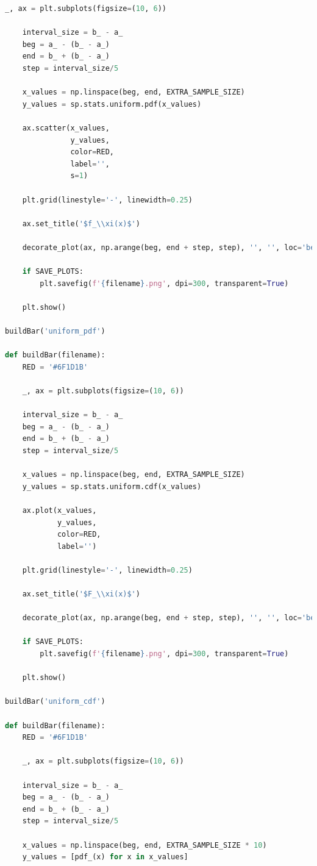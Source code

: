 \documentclass[a4paper, 14pt]{extarticle}
\begin{document}
\begin{center}
\begin{lstlisting}[language=Python]
    _, ax = plt.subplots(figsize=(10, 6))

    interval_size = b_ - a_
    beg = a_ - (b_ - a_)
    end = b_ + (b_ - a_)
    step = interval_size/5

    x_values = np.linspace(beg, end, EXTRA_SAMPLE_SIZE)
    y_values = sp.stats.uniform.pdf(x_values)

    ax.scatter(x_values, 
               y_values, 
               color=RED, 
               label='',
               s=1)

    plt.grid(linestyle='-', linewidth=0.25)

    ax.set_title('$f_\\xi(x)$')

    decorate_plot(ax, np.arange(beg, end + step, step), '', '', loc='best')

    if SAVE_PLOTS:
        plt.savefig(f'{filename}.png', dpi=300, transparent=True)

    plt.show()

buildBar('uniform_pdf')

def buildBar(filename):
    RED = '#6F1D1B'

    _, ax = plt.subplots(figsize=(10, 6))

    interval_size = b_ - a_
    beg = a_ - (b_ - a_)
    end = b_ + (b_ - a_)
    step = interval_size/5

    x_values = np.linspace(beg, end, EXTRA_SAMPLE_SIZE)
    y_values = sp.stats.uniform.cdf(x_values)

    ax.plot(x_values, 
            y_values, 
            color=RED, 
            label='')

    plt.grid(linestyle='-', linewidth=0.25)

    ax.set_title('$F_\\xi(x)$')

    decorate_plot(ax, np.arange(beg, end + step, step), '', '', loc='best')

    if SAVE_PLOTS:
        plt.savefig(f'{filename}.png', dpi=300, transparent=True)

    plt.show()

buildBar('uniform_cdf')

def buildBar(filename):
    RED = '#6F1D1B'

    _, ax = plt.subplots(figsize=(10, 6))

    interval_size = b_ - a_
    beg = a_ - (b_ - a_)
    end = b_ + (b_ - a_)
    step = interval_size/5
 
    x_values = np.linspace(beg, end, EXTRA_SAMPLE_SIZE * 10)
    y_values = [pdf_(x) for x in x_values]


\end{lstlisting}
\end{center}
\end{document}
